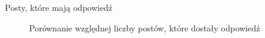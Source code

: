 \documentclass[./main.tex]{subfiles}
\begin{document}
\begin{frame}{Posty, które mają odpowiedź}

\begin{figure}%
    \centering
    \qquad
    \caption*{Porównanie względnej liczby postów, które dostały odpowiedź}
    \label{fig:example}%
\end{figure}
    
\end{frame}
\end{document}
